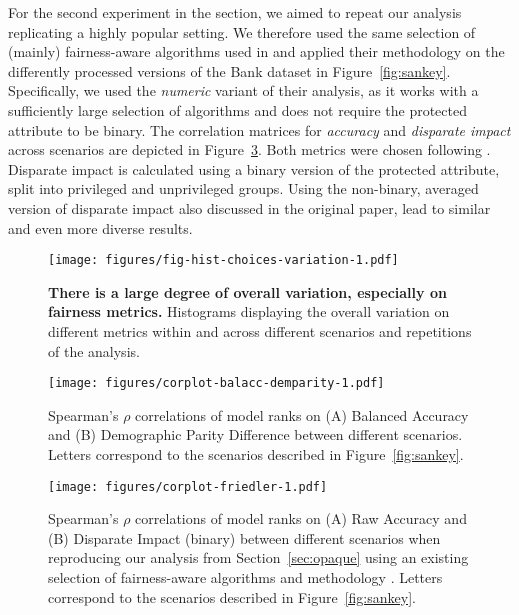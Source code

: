 For the second experiment in the section, we aimed to repeat our analysis replicating a highly popular setting. We therefore used the same selection of (mainly) fairness-aware algorithms used in \citet{friedler2019comparative} and applied their methodology on the differently processed versions of the Bank dataset in Figure~\ref{fig:sankey}. Specifically, we used the \textit{numeric} variant of their analysis, as it works with a sufficiently large selection of algorithms and does not require the protected attribute to be binary. The correlation matrices for \emph{accuracy} and \emph{disparate impact} across scenarios are depicted in Figure~\ref{fig:corplot-friedler}. Both metrics were chosen following \citet{friedler2019comparative}. Disparate impact is calculated using a binary version of the protected attribute, split into privileged and unprivileged groups. Using the non-binary, averaged version of disparate impact also discussed in the original paper, lead to similar and even more diverse results.

\begin{figure}    \texttt{[image: figures/fig-hist-choices-variation-1.pdf]} 
    \caption{\textbf{There is a large degree of overall variation, especially on fairness metrics.} Histograms displaying the overall variation on different metrics within and across different scenarios and repetitions of the analysis.}    \label{fig:fig-hist-choices-variation}\end{figure} 


\begin{figure}    \texttt{[image: figures/corplot-balacc-demparity-1.pdf]} 
    \caption{Spearman’s $\rho$ correlations of model ranks on (A) Balanced Accuracy and (B) Demographic Parity Difference between different scenarios. Letters correspond to the scenarios described in Figure~\ref{fig:sankey}.}    \label{fig:corplot-balacc-demparity}\end{figure} 

\begin{figure}    \texttt{[image: figures/corplot-friedler-1.pdf]} 
    \caption{Spearman’s $\rho$ correlations of model ranks on (A) Raw Accuracy and (B) Disparate Impact (binary) between different scenarios when reproducing our analysis from Section~\ref{sec:opaque} using an existing selection of fairness-aware algorithms and methodology \citep{friedler2019comparative}. Letters correspond to the scenarios described in Figure~\ref{fig:sankey}.}    \label{fig:corplot-friedler}\end{figure} 


